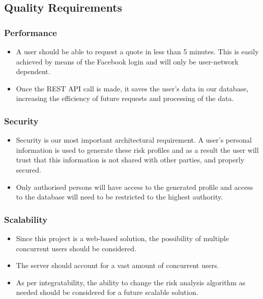 \documentclass{article}
\begin{document}
	
	\subsection{Quality Requirements}
		\subsubsection{Performance}
		\begin{itemize}
			\item A user should be able to request a quote in less than 5 minutes. This is easily achieved by means of the Facebook login and will only be user-network dependent.
			\item Once the REST API call is made, it saves the user's data in our database, increasing the efficiency of future requests and processing of the data.
		\end{itemize}
		 
		\subsubsection{Security}\label{subsubsec:security}
		\begin{itemize}
			\item Security is our most important architectural requirement. A user's personal information is used to generate these risk profiles and as a result the user will trust that this information is not shared with other parties, and properly secured.
			\item Only authorised persons will have access to the generated profile and access to the database will need to be restricted to the highest authority.
		\end{itemize}
		\subsubsection{Scalability}
		\begin{itemize}
			\item Since this project is a web-based solution, the possibility of multiple concurrent users should be considered.
			\item The server should account for a vast amount of concurrent users.
			\item As per integratability, the ability to change the risk analysis algorithm as needed should be considered for a future scalable solution.
		\end{itemize}
\end{document}
